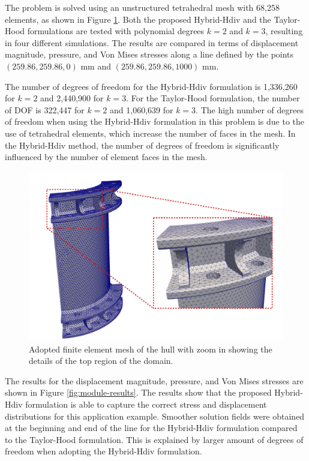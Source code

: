 \documentclass[english,11pt,3p,number,sort&compress]{elsarticle}
\begin{document}
The problem is solved using an unstructured tetrahedral mesh with 68,258 elements, as shown in Figure \ref{fig:module-mesh}. Both the proposed Hybrid-Hdiv and the Taylor-Hood formulations are tested with polynomial degrees $k=2$ and $k=3$, resulting in four different simulations. The results are compared in terms of displacement magnitude, pressure, and Von Mises stresses along a line defined by the points $(259.86, 259.86, 0)$ mm and $(259.86, 259.86, 1000)$ mm. 

The number of degrees of freedom  for the Hybrid-Hdiv formulation is 1,336,260 for $k=2$ and 2,440,900 for $k=3$. For the Taylor-Hood formulation, the number of DOF is 322,447 for $k=2$ and 1,060,639 for $k=3$. The high number of degrees of freedom when using the Hybrid-Hdiv formulation in this problem is due to the use of tetrahedral elements, which increase the number of faces in the mesh. In the Hybrid-Hdiv method, the number of degrees of freedom is significantly influenced by the number of element faces in the mesh.

\begin{figure}[h]
	\centering
	\includegraphics[scale=0.75]{hull-mesh.pdf}
	\caption{Adopted finite element mesh of the hull with zoom in showing the details of the top region of the domain.}
	\label{fig:module-mesh}
\end{figure}

The results for the displacement magnitude, pressure, and Von Mises stresses are shown in Figure \ref{fig:module-results}. The results show that the proposed Hybrid-Hdiv formulation is able to capture the correct stress and displacement distributions for this application example. Smoother solution fields were obtained at the beginning and end of the line for the Hybrid-Hdiv formulation compared to the Taylor-Hood formulation. This is explained by larger amount of degrees of freedom when adopting the Hybrid-Hdiv formulation. 
\end{document}
